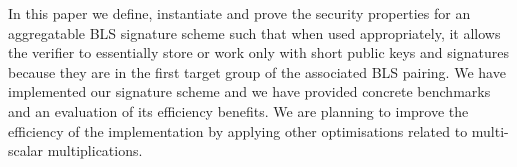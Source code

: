 \vspace{-0.01in}
\noindent In this paper we define, instantiate and prove the security properties for an aggregatable BLS signature 
scheme such that when used appropriately, it allows the verifier to essentially store or work only with short public keys 
and signatures because they are in the first target group of the associated BLS pairing. We have implemented
our signature scheme and we have provided concrete benchmarks and an evaluation of its efficiency benefits. We are planning to improve the efficiency of the implementation by applying other 
optimisations related to multi-scalar multiplications.


